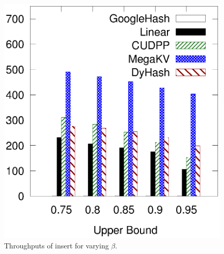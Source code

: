 \begin{figure}[t!]
\begin{minipage}{0.19\linewidth}
		\centerline{\dsali}
	\end{minipage}
	\hfill
	\begin{minipage}{0.19\linewidth}\centering
		\includegraphics[width=\linewidth]{pic/static-upper/upper_insert_random.eps}
		\centerline{\dsrandom}
	\end{minipage}
	\caption{Throughputs of insert for varying $\beta$.}
	\label{fig:static:all:insert}
\end{figure}
